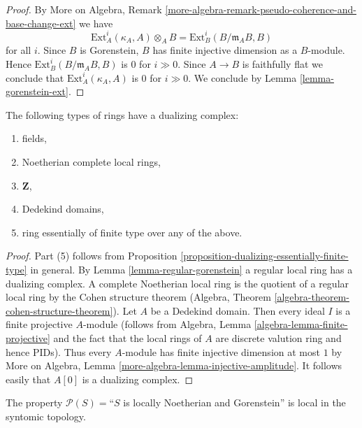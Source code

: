 \begin{proof}
By More on Algebra, Remark
\ref{more-algebra-remark-pseudo-coherence-and-base-change-ext}
we have
$$
\text{Ext}^i_A(\kappa_A, A) \otimes_A B =
\text{Ext}^i_B(B/\mathfrak m_A B, B)
$$
for all $i$. Since $B$ is Gorenstein, $B$ has finite injective dimension
as a $B$-module. Hence $\text{Ext}^i_B(B/\mathfrak m_A B, B)$
is $0$ for $i \gg 0$. Since $A \to B$ is faithfully flat
we conclude that $\text{Ext}^i_A(\kappa_A, A)$ is $0$
for $i \gg 0$. We conclude by Lemma \ref{lemma-gorenstein-ext}.
\end{proof}

\begin{lemma}
\label{lemma-ubiquity-dualizing}
The following types of rings have a dualizing complex:
\begin{enumerate}
\item fields,
\item Noetherian complete local rings,
\item $\mathbf{Z}$,
\item Dedekind domains,
\item ring essentially of finite type over any of the above.
\end{enumerate}
\end{lemma}

\begin{proof}
Part (5) follows from
Proposition \ref{proposition-dualizing-essentially-finite-type}
in general.
By Lemma \ref{lemma-regular-gorenstein} a regular local ring has a
dualizing complex.
A complete Noetherian local ring is the quotient of a regular
local ring by the Cohen structure theorem
(Algebra, Theorem \ref{algebra-theorem-cohen-structure-theorem}).
Let $A$ be a Dedekind domain. Then every ideal $I$ is a finite
projective $A$-module (follows from
Algebra, Lemma \ref{algebra-lemma-finite-projective}
and the fact that the local rings of $A$ are discrete valution ring
and hence PIDs). Thus every $A$-module has finite injective dimension
at most $1$ by
More on Algebra, Lemma \ref{more-algebra-lemma-injective-amplitude}.
It follows easily that $A[0]$ is a dualizing complex.
\end{proof}

\begin{lemma}
\label{lemma-gorenstein-local-syntomic}
The property $\mathcal{P}(S) =$``$S$ is locally Noetherian and Gorenstein''
is local in the syntomic topology.
\end{lemma}

